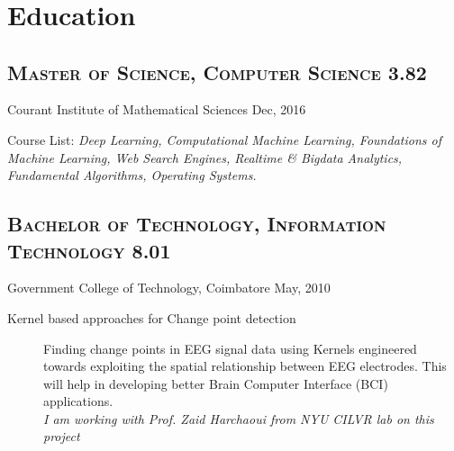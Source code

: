 \documentclass{resume}
\begin{document}
\\

\\
\\
\section{Education}
\subsection[Master of Science, Computer Science]{\textsc{Master of Science, Computer Science} \hfill \textbf{3.82}}%
\small{Courant Institute of Mathematical Sciences} \hfill \small{Dec, 2016}
  \begin{description}
    \item{Course List:} \small{\textit{Deep Learning, Computational Machine Learning, Foundations of Machine Learning, Web Search Engines, Realtime \& Bigdata Analytics, Fundamental Algorithms, Operating Systems.}}
  \end{description}
\subsection[Bachelor of Technology, Information Technology]{\textsc{Bachelor of Technology, Information Technology} \hfill \textbf{8.01}}%
\small{Government College of Technology, Coimbatore} \hfill \small{May, 2010}

  \begin{description}
    \item[Kernel based approaches for Change point detection]  Finding change points in EEG signal data using Kernels engineered towards exploiting the spatial relationship between EEG electrodes.  This will help in developing better Brain Computer Interface (BCI) applications.\\
      \textit{I am working with Prof\@. Zaid Harchaoui from NYU CILVR lab on this project}
  \end{description}
\end{document}
